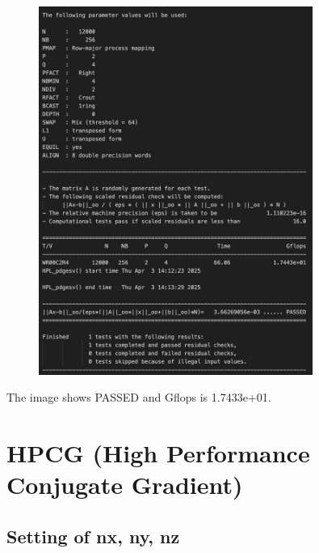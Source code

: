 \documentclass{article}
\begin{document}
\begin{figure}[htbp]
    \centering
    \includegraphics[width=0.8\textwidth]{./img/HPL_12000_256_2_4.png}
\end{figure}

The image shows PASSED and Gflops is 1.7433e+01.

\clearpage

\section*{HPCG (High Performance Conjugate Gradient)}
\subsection*{Setting of nx, ny, nz}



\end{document}
